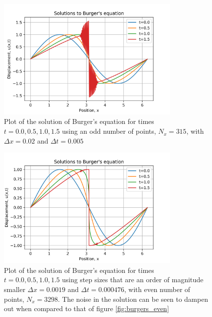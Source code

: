 \documentclass{article}
\begin{document}
\begin{figure}[H]
	\centering
	\includegraphics[width=0.8\textwidth]{../images/burgers_odd.png}
	\caption{Plot of the solution of Burger's equation for times $t=0.0,0.5,1.0,1.5$ using an odd number of points, $N_x=315$, with $\Delta x=0.02$ and $\Delta t=0.005$}
	\label{fig:burgers_odd}
\end{figure}

\begin{figure}[H]
	\centering
	\includegraphics[width=0.8\textwidth]{../images/burgers_damped.png}
	\caption{Plot of the solution of Burger's equation for times $t=0.0,0.5,1.0,1.5$ using step sizes that are an order of magnitude smaller $\Delta x=0.0019$ and $\Delta t=0.000476$, with even number of points, $N_x=3298$. The noise in the solution can be seen to dampen out when compared to that of figure \ref{fig:burgers_even}}
	\label{fig:burgers_damped}
\end{figure}
\end{document}
